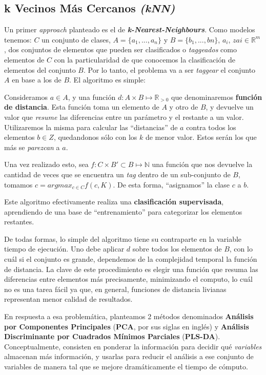 \subsection{k Vecinos M\'as Cercanos \textit{(kNN)}}\label{intro_knn}

Un primer \textit{approach} planteado es el de \textit{\textbf{k-Nearest-Neighbours}}. Como modelos tenemos: $C$ un conjunto de clases, $A = \{a_{1}, ..., a_{n}\}$ y $B = \{b_{1}, ..., b{n}\}$, $a_{i}$, $za{i} \in \mathbb{R}^m$, dos conjuntos de elementos que pueden ser clasificados o \textit{taggeados} como elementos de $C$ con la particularidad de que conocemos la clasificaci\'on de elementos del conjunto $B$. Por lo tanto, el problema va a ser \textit{taggear} el conjunto $A$ en base a los de $B$. El algoritmo es simple:

Consideramos $a \in A$, y una funci\'on $d : A \times B \mapsto \mathbb{R}_{> 0}$ que denominaremos \textbf{funci\'on de distancia}. Esta funci\'on toma un elemento de $A$ y otro de $B$, y devuelve un valor que \textit{resume} las diferencias entre un par\'ametro y el restante a un valor. Utilizaremos la misma para calcular las ``distancias'' de $a$ contra todos los elementos $b \in Z$, quedandonos s\'olo con los $k$ de menor valor. Estos ser\'an los que m\'as se \textit{parezcan} a $a$.

Una vez realizado esto, sea $f : C \times B' \subset B \mapsto \mathbb{N}$ una funci\'on que nos devuelve la cantidad de veces que se encuentra un \textit{tag} dentro de un sub-conjunto de $B$, tomamos $c = argmax_{c \in C} f(c, K)$. De esta forma, ``asignamos'' la clase $c$ a $b$.

Este algoritmo efectivamente realiza una \textbf{clasificaci\'on supervisada}, aprendiendo de una base de ``entrenamiento'' para categorizar los elementos restantes.

De todas formas, lo simple del algoritmo tiene su contraparte en la variable tiempo de ejecuci\'on. Uno debe aplicar $d$ sobre todos los elementos de $B$, con lo cu\'al si el conjunto es grande, dependemos de la complejidad temporal la funci\'on de distancia. La clave de este procedimiento es elegir una funci\'on que resuma las diferencias entre elementos m\'as precisamente, minimizando el computo, lo cu\'al no es una tarea f\'acil ya que, en general, funciones de distancia livianas representan menor calidad de resultados.

En respuesta a esa problem\'atica, planteamos 2 m\'etodos denominados \textbf{An\'alisis por Componentes Principales} (\textbf{PCA}, por sus siglas en ingl\'es) y \textbf{An\'alisis Discriminante por Cuadrados M\'inimos Parciales} (\textbf{PLS-DA}). Conceptualmente, consisten en ponderar la informaci\'on para decidir qu\'e \textit{variables} almacenan m\'as informaci\'on, y usarlas para reducir el an\'alisis a ese conjunto de variables de manera tal que se mejore dram\'aticamente el tiempo de c\'omputo.

